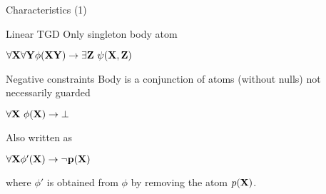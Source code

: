 \documentclass{beamer}
\begin{document}
 
 \begin{frame}{Characteristics (1)}
 
 \begin{block}{Linear TGD}
 Only singleton body atom
 
 \begin{center}
 $\forall \bf{X} \forall \bf{Y}  \phi (\bf{X} \bf{Y}) \rightarrow  \exists \bf{Z} ~\psi (\bf{X}, \bf{Z})$
 \end{center}

 \end{block}
 
\begin{block}{Negative constraints}
Body is a conjunction of atoms (without nulls) not necessarily guarded 

\begin{center}
 $\forall \bf{X} \  \phi (\bf{X}) \rightarrow \bot$
 \end{center}
 
 Also written as 
 \begin{center}
 $\forall \bf{X}  \phi' (\bf{X} ) \rightarrow  \neg p (\bf{X})$
 \end{center}
 
 where $\phi' $ is obtained from $\phi$ by removing the atom $p (\bf{X})$.
 
\end{block} 
 
 \end{frame}
 
\end{document}
